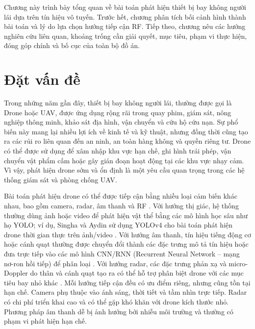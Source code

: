 \documentclass[../DoAn.tex]{subfiles}
\begin{document}
Chương này trình bày tổng quan về bài toán phát hiện thiết bị bay không người lái dựa trên tín hiệu vô tuyến. Trước hết, chương phân tích bối cảnh hình thành bài toán và lý do lựa chọn hướng tiếp cận RF. Tiếp theo, chương nêu các hướng nghiên cứu liên quan, khoảng trống cần giải quyết, mục tiêu, phạm vi thực hiện, đóng góp chính và bố cục của toàn bộ đồ án.

\section{Đặt vấn đề}
\label{sec:dvd}

Trong những năm gần đây, thiết bị bay không người lái, thường được gọi là Drone hoặc UAV, được ứng dụng rộng rãi trong quay phim, giám sát, nông nghiệp thông minh, khảo sát địa hình, vận chuyển và cứu hộ cứu nạn. Sự phổ biến này mang lại nhiều lợi ích về kinh tế và kỹ thuật, nhưng đồng thời cũng tạo ra các rủi ro liên quan đến an ninh, an toàn hàng không và quyền riêng tư. Drone có thể được sử dụng để xâm nhập khu vực hạn chế, ghi hình trái phép, vận chuyển vật phẩm cấm hoặc gây gián đoạn hoạt động tại các khu vực nhạy cảm. Vì vậy, phát hiện drone sớm và ổn định là một yêu cầu quan trọng trong các hệ thống giám sát và phòng chống UAV.

Bài toán phát hiện drone có thể được tiếp cận bằng nhiều loại cảm biến khác nhau, bao gồm camera, radar, âm thanh và RF \cite{taha2019state}. Với hướng thị giác, hệ thống thường dùng ảnh hoặc video để phát hiện vật thể bằng các mô hình học sâu như họ YOLO; ví dụ, Singha và Aydin sử dụng YOLOv4 cho bài toán phát hiện drone thời gian thực trên ảnh/video \cite{singha2021yolov4}. Với hướng âm thanh, tín hiệu tiếng động cơ hoặc cánh quạt thường được chuyển đổi thành các đặc trưng mô tả tín hiệu hoặc đưa trực tiếp vào các mô hình CNN/RNN (Recurrent Neural Network – mạng nơ-ron hồi tiếp) để phân loại \cite{anwar2019sound,alemadi2019audio}. Với hướng radar, các đặc trưng phản xạ và micro-Doppler do thân và cánh quạt tạo ra có thể hỗ trợ phân biệt drone với các mục tiêu bay nhỏ khác \cite{dewit2012microdoppler}. Mỗi hướng tiếp cận đều có ưu điểm riêng, nhưng cũng tồn tại hạn chế. Camera phụ thuộc vào ánh sáng, thời tiết và tầm nhìn trực tiếp. Radar có chi phí triển khai cao và có thể gặp khó khăn với drone kích thước nhỏ. Phương pháp âm thanh dễ bị ảnh hưởng bởi nhiễu môi trường và thường có phạm vi phát hiện hạn chế.
\end{document}
